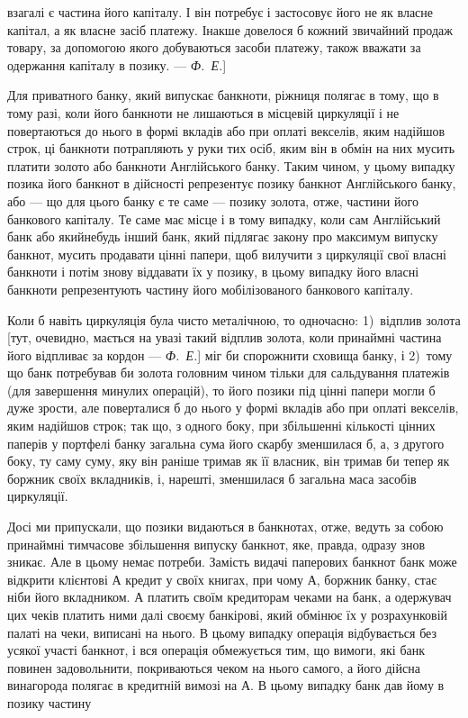 \parcont{}  %
взагалі є частина його капіталу. І він потребує і застосовує його
не як власне капітал, а як власне засіб платежу. Інакше довелося
б кожний звичайний продаж товару, за допомогою якого
добуваються засоби платежу, також вважати за одержання капіталу
в позику. — \emph{Ф.~Е.}]

Для приватного банку, який випускає банкноти, ріжниця полягає
в тому, що в тому разі, коли його банкноти не лишаються
в місцевій циркуляції і не повертаються до нього в формі
вкладів або при оплаті векселів, яким надійшов строк, ці банкноти
потрапляють у руки тих осіб, яким він в обмін на них
мусить платити золото або банкноти Англійського банку.
Таким чином, у цьому випадку позика його банкнот в дійсності
репрезентує позику банкнот Англійського банку, або — що для
цього банку є те саме — позику золота, отже, частини його
банкового капіталу. Те саме має місце і в тому випадку, коли
сам Англійський банк або якийнебудь інший банк, який підлягає
закону про максимум випуску банкнот, мусить продавати
цінні папери, щоб вилучити з циркуляції свої власні банкноти
і потім знову віддавати їх у позику, в цьому випадку
його власні банкноти репрезентують частину його мобілізованого
банкового капіталу.

Коли б навіть циркуляція була чисто металічною, то одночасно:
1)~відплив золота [тут, очевидно, мається на увазі такий
відплив золота, коли принаймні частина його відпливає за кордон
— \emph{Ф.~Е.}] міг би спорожнити сховища банку, і 2)~тому що
банк потребував би золота головним чином тільки для сальдування
платежів (для завершення минулих операцій), то його позики
під цінні папери могли б дуже зрости, але поверталися б до
нього у формі вкладів або при оплаті векселів, яким надійшов
строк; так що, з одного боку, при збільшенні кількості цінних
паперів у портфелі банку загальна сума його скарбу зменшилася
б, а, з другого боку, ту саму суму, яку він раніше тримав
як її власник, він тримав би тепер як боржник своїх вкладників,
і, нарешті, зменшилася б загальна маса засобів циркуляції.

Досі ми припускали, що позики видаються в банкнотах,
отже, ведуть за собою принаймні тимчасове збільшення випуску
банкнот, яке, правда, одразу знов зникає. Але в цьому
немає потреби. Замість видачі паперових банкнот банк може
відкрити клієнтові $А$ кредит у своїх книгах, при чому $А$, боржник
банку, стає ніби його вкладником. $А$ платить своїм кредиторам
чеками на банк, а одержувач цих чеків платить ними
далі своєму банкірові, який обмінює їх у розрахунковій палаті на
чеки, виписані на нього. В цьому випадку операція відбувається
без усякої участі банкнот, і вся операція обмежується тим, що
вимоги, які банк повинен задовольнити, покриваються чеком на
нього самого, а його дійсна винагорода полягає в кредитній вимозі
на $А$. В цьому випадку банк дав йому в позику частину
\parbreak{}  %
